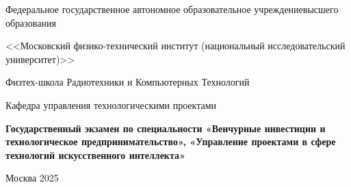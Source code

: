 \begin{titlepage}
  \begin{center}
  
    Федеральное государственное автономное образовательное учреждение\break высшего образования\par
    <<Московский физико-технический институт \break (национальный исследовательский университет)>>\par
    Физтех-школа Радиотехники и Компьютерных Технологий\par
    Кафедра управления технологическими проектами\par


    \vspace*{\fill}
    {\Large \textbf{Государственный экзамен по специальности «Венчурные инвестиции и технологическое предпринимательство», «Управление проектами в сфере технологий искусственного интеллекта»}}
    \vspace*{\fill}

%

      Москва 2025
    \end{center}
\end{titlepage}
